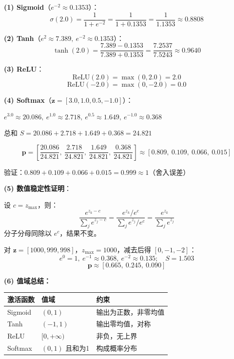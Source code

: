 \documentclass[a4paper,11pt]{ctexart}
\begin{document}
\begin{solutionbox}[参考答案与详细解析]
    \textbf{(1) Sigmoid}（$e^{-2} \approx 0.1353$）：
    \[
    \sigma(2.0) = \frac{1}{1+e^{-2}} = \frac{1}{1+0.1353} = \frac{1}{1.1353} \approx \boxed{0.8808}
    \]

    \textbf{(2) Tanh}（$e^2 \approx 7.389,\ e^{-2} \approx 0.1353$）：
    \[
    \tanh(2.0) = \frac{7.389 - 0.1353}{7.389 + 0.1353} = \frac{7.2537}{7.5243} \approx \boxed{0.9640}
    \]

    \textbf{(3) ReLU}：
    \[
    \text{ReLU}(2.0) = \max(0, 2.0) = \boxed{2.0}
    \]
    \[
    \text{ReLU}(-2.0) = \max(0, -2.0) = \boxed{0.0}
    \]

    \textbf{(4) Softmax}（$\mathbf{z} = [3.0, 1.0, 0.5, -1.0]$）：

    $e^{3.0}\approx20.086,\ e^{1.0}\approx2.718,\ e^{0.5}\approx1.649,\ e^{-1.0}\approx0.368$

    总和 $S = 20.086 + 2.718 + 1.649 + 0.368 = 24.821$

    \[
    \mathbf{p} = \left[\frac{20.086}{24.821},\ \frac{2.718}{24.821},\ \frac{1.649}{24.821},\ \frac{0.368}{24.821}\right]
    \approx \boxed{[0.809,\ 0.109,\ 0.066,\ 0.015]}
    \]

    验证：$0.809+0.109+0.066+0.015 = 0.999 \approx 1$（舍入误差）\checkmark

    \textbf{(5) 数值稳定性证明}：

    设 $c = z_{\max}$，则：
    \[
    \frac{e^{z_k - c}}{\sum_j e^{z_j - c}} = \frac{e^{z_k}/e^c}{\sum_j e^{z_j}/e^c} = \frac{e^{z_k}}{\sum_j e^{z_j}}
    \]
    分子分母同除以 $e^c$，结果不变。

    对 $\mathbf{z}=[1000,999,998]$，$z_{\max}=1000$，减去后得 $[0,-1,-2]$：
    \[
    e^0=1,\ e^{-1}\approx0.368,\ e^{-2}\approx0.135;\quad S=1.503
    \]
    \[
    \mathbf{p} \approx \boxed{[0.665,\ 0.245,\ 0.090]}
    \]

    \textbf{(6) 值域总结：}

    \begin{center}
    \begin{tabular}{lll}
        \toprule
        激活函数 & 值域 & 约束 \\
        \midrule
        Sigmoid & $(0, 1)$ & 输出为正数，非零均值 \\
        Tanh & $(-1, 1)$ & 输出零均值，对称 \\
        ReLU & $[0, +\infty)$ & 非负，无上界 \\
        Softmax & $(0,1)$ 且和为1 & 构成概率分布 \\
        \bottomrule
    \end{tabular}
    \end{center}
\end{solutionbox}
\end{document}
